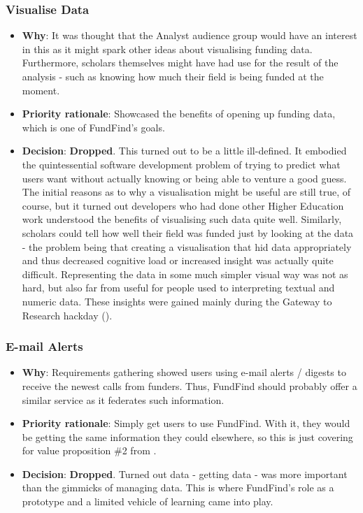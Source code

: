 \subsubsection{Visualise Data}
\begin{itemize}
 \item \textbf{Why}: It was thought that the Analyst audience group  would have an interest in this as it might spark other ideas about visualising funding data. Furthermore, scholars themselves might have had use for the result of the analysis - such as knowing how much their field is being funded at the moment.
 \item \textbf{Priority rationale}: Showcased the benefits of opening up funding data, which is one of FundFind's goals.
 \item \textbf{Decision}: \textbf{Dropped}. This turned out to be a little ill-defined. It embodied the quintessential software development problem of trying to predict what users want without actually knowing or being able to venture a good guess. The initial reasons as to why a visualisation might be useful are still true, of course, but it turned out developers who had done other Higher Education work understood the benefits of visualising such data quite well. Similarly, scholars could tell how well their field was funded just by looking at the data - the problem being that creating a visualisation that hid data appropriately and thus decreased cognitive load or increased insight was actually quite difficult. Representing the data in some much simpler visual way was not as hard, but also far from useful for people used to interpreting textual and numeric data. These insights were gained mainly during the Gateway to Research hackday ().
\end{itemize}

\subsubsection{E-mail Alerts}
\begin{itemize}
 \item \textbf{Why}: Requirements gathering showed users using e-mail alerts / digests to receive the newest calls from funders. Thus, FundFind should probably offer a similar service as it federates such information.
 \item \textbf{Priority rationale}: Simply get users to use FundFind. With it, they would be getting the same information they could elsewhere, so this is just covering for value proposition \#2 from .
 \item \textbf{Decision}: \textbf{Dropped}. Turned out data - getting data - was more important than the gimmicks of managing data. This is where FundFind's role as a prototype and a limited vehicle of learning came into play.
\end{itemize}

